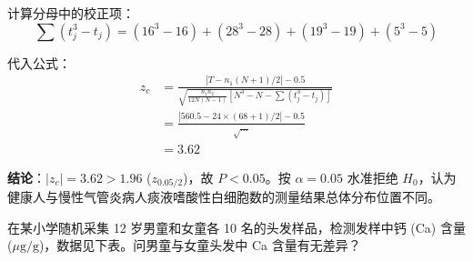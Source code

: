 \documentclass[lang=cn,10pt]{elegantbook}
\begin{document}
\begin{solution}
计算分母中的校正项：
\[
\sum(t_j^3 - t_j) = (16^3-16) + (28^3-28) + (19^3-19) + (5^3-5)
\]

代入公式：
\[
\begin{aligned}
z_c &= \frac{|T - n_1(N+1)/2| - 0.5}{\sqrt{\frac{n_1 n_2}{12N(N-1)} [N^3 - N - \sum(t_j^3 - t_j)]}} \\
&= \frac{|560.5 - 24 \times (68+1)/2| - 0.5}{\sqrt{\dots}} \\
&= 3.62
\end{aligned}
\]

\textbf{结论}：$|z_c| = 3.62 > 1.96$ ($z_{0.05/2}$)，故 $P < 0.05$。按 $\alpha=0.05$ 水准拒绝 $H_0$，认为健康人与慢性气管炎病人痰液嗜酸性白细胞数的测量结果总体分布位置不同。
\end{solution}

\vspace{0.2cm}
\begin{exercise}
在某小学随机采集 12 岁男童和女童各 10 名的头发样品，检测发样中钙 (Ca) 含量 ($\mu\mathrm{g}/\mathrm{g}$)，数据见下表。问男童与女童头发中 Ca 含量有无差异？
\end{exercise}
\end{document}

